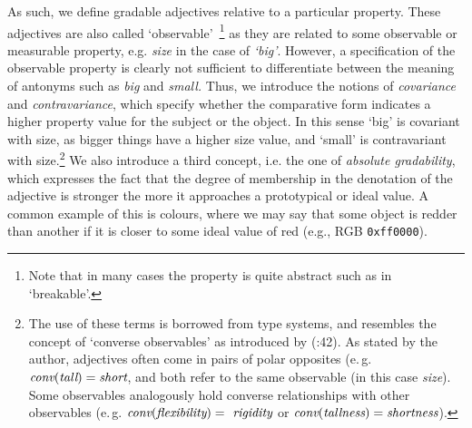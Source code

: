 \documentclass[11pt]{article}
\begin{document}
As such, we define gradable adjectives relative to a particular 
property. These adjectives are also called `observable'~\cite{Bennett06kr}\footnote{Note that in many cases the property is quite abstract such as in 
`breakable'.} as they are related to some observable or measurable property, e.g. \emph{size} in the case of \emph{`big'}. However, a specification of the observable property is clearly not sufficient to differentiate between the meaning of antonyms such as \emph{big} and \emph{small.}
Thus, we introduce the notions of \emph{covariance} and \emph{contravariance}, which specify 
whether the comparative form indicates a higher property value for the subject 
or the object. In this sense `big' is covariant with size, as bigger things have 
a higher size value, and `small' is contravariant with size.\footnote{
    The use of these terms is borrowed from type systems, and resembles the concept of `converse observables' as introduced by (\cite{Bennett06kr}:42). As stated by the author, adjectives often come in pairs of polar opposites (e.\,g. $\text{\em conv}(\text{\em tall})=\text{\em short}$, and both refer to the same observable (in this case \textit{size}). Some observables analogously hold converse relationships with other observables (e.\,g. $\text{\em conv}(\text{\em flexibility})=\text{\em rigidity}$ or $\text{\em conv}(\text{\em tallness})=\text{\em shortness}$).} 
    We also introduce a third concept, i.e. the one of \emph{absolute gradability}, which expresses the fact that the degree of membership in the denotation of the adjective is stronger the more it approaches a prototypical or ideal value.
A common example of this is colours, where we may say that some object is 
redder than another if it is closer to some ideal value of red 
(e.g., RGB {\tt 0xff0000}).
\end{document}
